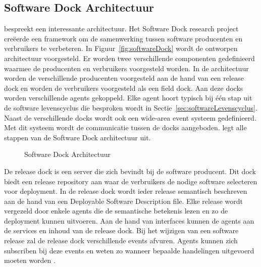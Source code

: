 \subsection{Software Dock Architectuur}\label{sec:softwareDock}
\citet{hall1999cooperative} bespreekt een interessante architectuur.
Het Software Dock research project creëerde een framework om de samenwerking tussen software producenten en verbruikers te verbeteren.
In Figuur~\vref{fig:softwareDock} wordt de ontworpen architectuur voorgesteld.
Er worden twee verschillende componenten gedefinieerd waarmee de producenten en verbruikers voorgesteld worden.
In de architectuur worden de verschillende producenten voorgesteld aan de hand van een release dock en worden de verbruikers voorgesteld als een field dock.
Aan deze docks worden verschillende agents gekoppeld.
Elke agent hoort typisch bij één stap uit de software levenscyclus die besproken wordt in Sectie~\vref{sec:softwareLevenscyclus}.
Naast de verschillende docks wordt ook een wide-area event systeem gedefinieerd.
Met dit systeem wordt de communicatie tussen de docks aangeboden.
\citet{hall1997architecture} legt alle stappen van de Software Dock architectuur uit.

\begin{figure}[!ht]
\centering
{}
\caption{Software Dock Architectuur \citep{hall1999cooperative}}
\label{fig:softwareDock}
\end{figure}

De release dock is een server die zich bevindt bij de software producent.
Dit dock biedt een release repository aan waar de verbruikers de nodige software selecteren voor deployment.
In de release dock wordt ieder release semantisch beschreven aan de hand van een Deployable Software Description file.
Elke release wordt vergezeld door enkele agents die de semantische betekenis lezen en zo de deployment kunnen uitvoeren.
Aan de hand van interfaces kunnen de agents aan de services en inhoud van de release dock.
Bij het wijzigen van een software release zal de release dock verschillende events afvuren.
Agents kunnen zich subscriben bij deze events en weten zo wanneer bepaalde handelingen uitgevoerd moeten worden \citep{hall1999cooperative}.

